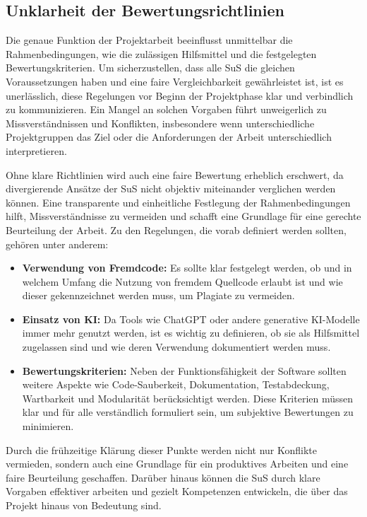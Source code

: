 \documentclass[a4paper,12pt]{article}
\begin{document}
\subsection{Unklarheit der Bewertungsrichtlinien}
Die genaue Funktion der Projektarbeit beeinflusst unmittelbar die Rahmenbedingungen, wie die zulässigen Hilfsmittel und die festgelegten Bewertungskriterien. Um sicherzustellen, dass alle SuS die gleichen Voraussetzungen haben und eine faire Vergleichbarkeit gewährleistet ist, ist es unerlässlich, diese Regelungen vor Beginn der Projektphase klar und verbindlich zu kommunizieren. Ein Mangel an solchen Vorgaben führt unweigerlich zu Missverständnissen und Konflikten, insbesondere wenn unterschiedliche Projektgruppen das Ziel oder die Anforderungen der Arbeit unterschiedlich interpretieren.

Ohne klare Richtlinien wird auch eine faire Bewertung erheblich erschwert, da divergierende Ansätze der SuS nicht objektiv miteinander verglichen werden können. Eine transparente und einheitliche Festlegung der Rahmenbedingungen hilft, Missverständnisse zu vermeiden und schafft eine Grundlage für eine gerechte Beurteilung der Arbeit.
Zu den Regelungen, die vorab definiert werden sollten, gehören unter anderem:

\begin{itemize}
    \item \textbf{Verwendung von Fremdcode:} Es sollte klar festgelegt werden, ob und in welchem Umfang die Nutzung von fremdem Quellcode erlaubt ist und wie dieser gekennzeichnet werden muss, um Plagiate zu vermeiden.
    \item \textbf{Einsatz von KI:} Da Tools wie ChatGPT oder andere generative KI-Modelle immer mehr genutzt werden, ist es wichtig zu definieren, ob sie als Hilfsmittel zugelassen sind und wie deren Verwendung dokumentiert werden muss.
    \item \textbf{Bewertungskriterien:} Neben der Funktionsfähigkeit der Software sollten weitere Aspekte wie Code-Sauberkeit, Dokumentation, Testabdeckung, Wartbarkeit und Modularität berücksichtigt werden. Diese Kriterien müssen klar und für alle verständlich formuliert sein, um subjektive Bewertungen zu minimieren.
\end{itemize}

Durch die frühzeitige Klärung dieser Punkte werden nicht nur Konflikte vermieden, sondern auch eine Grundlage für ein produktives Arbeiten und eine faire Beurteilung geschaffen. Darüber hinaus können die SuS durch klare Vorgaben effektiver arbeiten und gezielt Kompetenzen entwickeln, die über das Projekt hinaus von Bedeutung sind.
\end{document}
